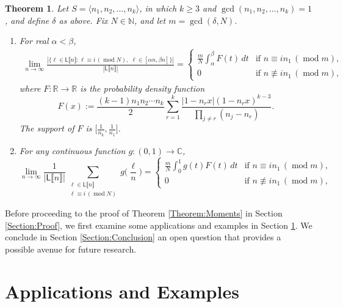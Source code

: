\documentclass[10pt,reqno]{amsart}
\newcommand{\NN}{\mathbb{N}}
\newcommand{\RR}{\mathbb{R}}
\newcommand{\CC}{\mathbb{C}}
\newcommand{\Le}{\mathsf{L}}
\providecommand{\multi}[1]{\llbracket #1 \rrbracket}
\newcommand{\0}{\color{lightgray}0}
\renewcommand{\pmod}[1]{\,(\operatorname{mod} #1)}
\renewcommand\>{\rangle}
\newcommand\<{\langle}
\theoremstyle{plain}
\newtheorem{Theorem}[equation]{Theorem}
\theoremstyle{definition}
\newcounter{question}
\begin{document}
\begin{Theorem}\label{Theorem:Probability}
Let $S = \<n_1,n_2,\ldots,n_k\>$, in which $k \geq 3$ and $\gcd(n_1,n_2,\ldots,n_k)=1$, and define $\delta$ as above.  Fix $N \in \NN$, and let $m = \gcd(\delta, N)$.  
\begin{enumerate}
\item For real $\alpha < \beta$,
\begin{align*}
\lim_{n\to\infty} \frac{ |\{ \ell \in \Le\multi{n} : \ell \equiv i \pmod{N}, \, \,  \ell \in[\alpha n, \beta n]\} |}{ | \Le\multi{n} |} 
=
\begin{cases}
\displaystyle \frac{m}{N}  \int_{\alpha}^{\beta} F(t)\,dt & \text{if $n \equiv i n_1 \pmod{ m }$},\\[8pt]
 0&\text{if $n \not \equiv i n_1 \pmod{ m}$},
\end{cases}
\end{align*}
where $F:\RR\to\RR$ is the probability density function 
\begin{equation*}
F(x) :=\frac{(k-1)n_1n_2\cdots n_k}{2}\sum_{r=1}^k \frac{|1-n_rx|(1-n_r x)^{k-3}}{\prod_{j\neq r}(n_j-n_r)}.
\end{equation*}
The support of $F$ is $\big[\frac{1}{n_k}, \frac{1}{n_1}\big]$.  

\item For any continuous function $g:(0,1)\to\CC$,
\begin{equation*}
\lim_{n\to\infty}  \frac{1}{ |\Le\multi{n}|} \sum_{\substack{\ell \in \Le\multi{n} \\ \ell \equiv i \pmod{N}}} 
 g\bigg(\frac{\ell}{n}\bigg) 
 =
\begin{cases}
\displaystyle \frac{m}{N}  \int_0^1 g(t) F(t)\,dt & \text{if $n \equiv i n_1 \pmod{ m }$},\\[8pt]
 0&\text{if $n \not \equiv i n_1 \pmod{ m}$},
\end{cases}
\end{equation*}
\end{enumerate}
\end{Theorem}

Before proceeding to the proof of Theorem \ref{Theorem:Moments} in Section \ref{Section:Proof}, we first examine some applications and examples in Section \ref{Section:Applications}.  We conclude in 
Section \ref{Section:Conclusion} an open question that provides a possible avenue for future research.


\section{Applications and Examples}\label{Section:Applications}
\end{document}
